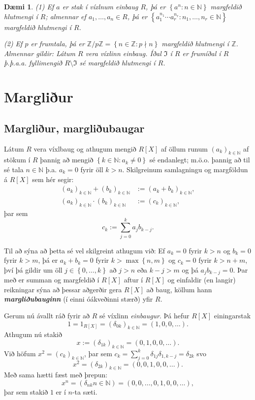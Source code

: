 \documentclass[a4paper,icelandic,11pt]{book}
\theoremstyle{plain}
\newtheorem{daemi}{Dæmi}[chapter]
\newcommand{\N}{\mathbb{N}}
\newcommand{\Z}{\mathbb{Z}}
\begin{document}
\begin{daemi}
  (1) Ef $a$ er stak í víxlnum einbaug $R$, þá er $\left\{ a^n:n\in\N \right\}$
  margfeldið hlutmengi í $R$; almennar ef $a_1,\dots,a_n\in R$, þá er $\left\{
  a_1^{n_1}\cdots a_r^{n_r}:n_1,\dots,n_r \in\N\right\}$ margfeldið hlutmengi í
  $R$.

  (2) Ef $p$ er frumtala, þá er $\Z/p\Z = \left\{ n\in\Z:p\nmid n \right\}$
  margfeldið hlutmengi í $\Z$. Almennar gildir: Látum $R$ vera víxlinn einbaug.
  Íðal $\mathfrak I$ í $R$ er frumíðal í $R$ þ.þ.a.a. fyllimengið
  $R\setminus\mathfrak I$ sé margfeldið hlutmengi í $R$.
\end{daemi}

\chapter{Margliður}
\section{Margliður, margliðubaugar}
\begin{skilgr}
  Látum $R$ vera víxlbaug og athugum mengið $R[X]$ af öllum runum
  $(a_k)_{k\in\N}$ af stökum í $R$ þannig að mengið $\left\{ k\in\N:a_k\neq 0
  \right\}$ sé endanlegt; m.ö.o. þannig að til sé tala $n\in\N$ þ.a. $a_k = 0$
  fyrir öll $k>n$. Skilgreinum samlagningu og margföldun á $R[X]$ sem hér segir:
  \begin{align*}
    (a_k)_{k\in\N} + (b_k)_{k\in\N}
    &:= (a_k+b_k)_{k\in\N},
    \\
    (a_k)_{k\in\N}\cdot (b_k)_{k\in\N}
    &:= (c_k)_{k\in\N},
  \end{align*}
  þar sem\[
  c_k := \sum_{j=0}^{k}a_j b_{k-j}.
  \]
\end{skilgr}
Til að sýna að þetta sé vel skilgreint athugum við: Ef $a_k = 0$ fyrir $k>n$ og
$b_k = 0$ fyrir $k>m$, þá er $a_k + b_k =0$ fyrir $k > \max\left\{ n,m \right\}$
og $c_k = 0$ fyrir $k > n+m$, því þá gildir um öll $j\in\left\{ 0,\dots,k
\right\}$ að $j>n$ eða $k-j>m$ og þá $a_j b_{k-j}=0$. Þar með er summan og
margfeldið í $R[X]$ aftur í $R[X]$ og einfaldir (en langir) reikningar sýna að
þessar aðgerðir gera $R[X]$ að baug, köllum hann
\textbf{\emph{margliðubauginn}}
(í einni óákveðinni stærð) yfir $R$. 

Gerum nú ávallt ráð fyrir að $R$ sé víxlinn \emph{einbaugur}. Þá hefur
$R[X]$ einingarstak\[
1 = 1_{R[X]} = (\delta_{0k})_{k\in\N} = (1,0,0,\dots).
\]
Athugum nú stakið\[
x := (\delta_{1k})_{k\in\N} = (0,1,0,0,\dots).
\]
Við höfum $x^2 = (c_k)_{k\in\N}$, þar sem $c_k =
\sum_{j=0}^{k}\delta_{1j}\delta_{1,k-j}=\delta_{2k}$ svo\[
x^2 = (\delta_{2k})_{k\in\N} = \left( 0,0,1,0,0,\dots \right).
\]
Með sama hætti fæst með þrepun:\[
x^n = (\delta_{nk}n\in\N) = (0,0,\dots,0,1,0,0,\dots),
\]
þar sem stakið $1$ er í $n$-ta sæti.
\end{document}
